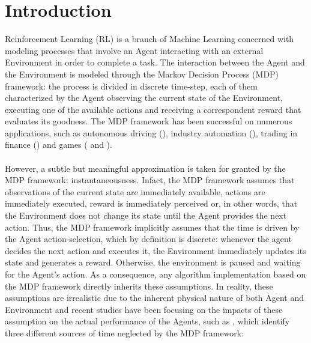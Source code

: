 \chapter{Introduction}
    Reinforcement Learning (RL) is a branch of Machine Learning concerned with modeling processes that involve an Agent interacting with an external Environment in order to complete a task. The interaction between the Agent and the Environment is modeled through the Markov Decision Process (MDP) framework: the process is divided in discrete time-step, each of them characterized by the Agent observing the current state of the Environment, executing one of the available actions and receiving a correspondent reward that evaluates its goodness. The MDP framework has been successful on numerous applications, such as autonomous driving (), industry automation (), trading in finance () and games ( and ).
    \\\\
    However, a subtle but meaningful approximation is taken for granted by the MDP framework: instantaneousness. Infact, the MDP framework assumes that observations of the current state are immediately available, actions are immediately executed, reward is immediately perceived or, in other words, that the Environment does not change its state until the Agent provides the next action. Thus, the MDP framework implicitly assumes that the time is driven by the Agent action-selection, which by definition is discrete: whenever the agent decides the next action and executes it, the Environment immediately updates its state and generates a reward. Otherwise, the environment is paused and waiting for the Agent's action. As a consequence, any algorithm implementation based on the MDP framework directly inherits these assumptions. In reality, these assumptions are irrealistic due to the inherent physical nature of both Agent and Environment and recent studies have been focusing on the impacts of these assumption on the actual performance of the Agents, such as , which identify three different sources of time neglected by the MDP framework:
